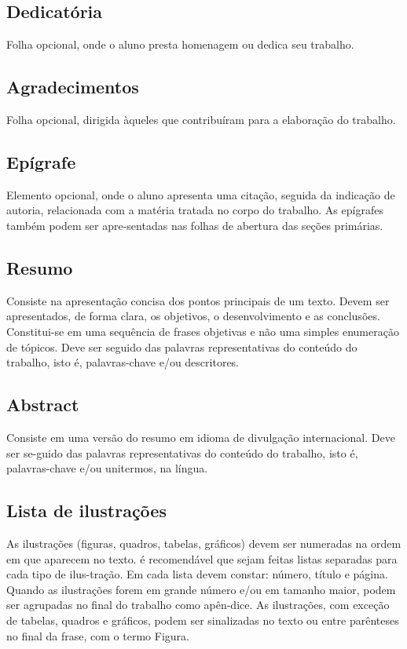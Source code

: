 \subsection{Dedicat\'{o}ria}

Folha opcional, onde o aluno presta homenagem ou dedica seu trabalho.

\subsection{Agradecimentos}

Folha opcional, dirigida \`{a}queles que contribuíram para a
elabora\c{c}ão do trabalho.

\subsection{Epígrafe}

Elemento opcional, onde o aluno apresenta uma cita\c{c}ão, seguida da
indica\c{c}ão de autoria, relacionada com a mat\'{e}ria tratada no corpo do trabalho. As epígrafes tamb\'{e}m podem ser apre-sentadas nas folhas de abertura das se\c{c}ões primárias.

\subsection{Resumo}

Consiste na apresenta\c{c}ão concisa dos pontos principais de um
texto. Devem ser apresentados, de forma clara, os objetivos, o desenvolvimento e as conclusões. Constitui-se em uma sequ\^{e}ncia de frases objetivas e não uma simples enumera\c{c}ão de t\'{o}picos. Deve ser seguido das palavras representativas do conteúdo do trabalho, isto \'{e}, palavras-chave e/ou descritores.

\subsection{Abstract}

Consiste em uma versão do resumo em idioma de divulga\c{c}ão
internacional. Deve ser se-guido das palavras representativas do conteúdo do trabalho, isto \'{e}, palavras-chave e/ou unitermos, na língua.

\subsection{Lista de ilustra\c{c}ões}

As ilustra\c{c}ões (figuras, quadros, tabelas, gráficos) devem ser
numeradas na ordem em que aparecem no texto. \'{e} recomendável que sejam feitas listas separadas para cada tipo de ilus-tra\c{c}ão. Em cada lista devem constar: número, título e página. Quando as ilustra\c{c}ões forem em grande número e/ou em tamanho maior, podem ser agrupadas no final do trabalho como ap\^{e}n-dice. As ilustra\c{c}ões, com exce\c{c}ão de tabelas, quadros e gráficos, podem ser sinalizadas no texto ou entre par\^{e}nteses no final da frase, com o termo Figura.

